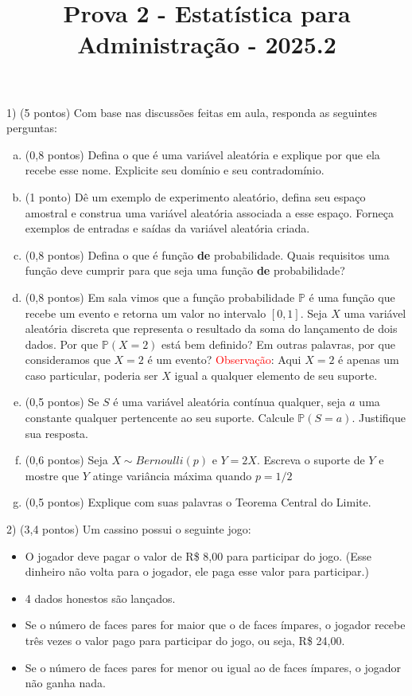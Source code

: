 \documentclass[12pt]{article}
\title{Prova 2 - Estatística para Administração - 2025.2}
\date{}
\makeatletter
\renewcommand{\maketitle}{
  \begin{center}
    {\small\bfseries \@title \par}
  \end{center}
  \vspace{-0.1cm} %
}
\makeatother
\begin{document}
\maketitle

1) (5 pontos) Com base nas discussões feitas em aula, responda as seguintes perguntas:

\begin{enumerate}[a)]
    \item (0,8 pontos) Defina o que é uma variável aleatória e explique por que ela recebe esse nome. Explicite seu domínio e seu contradomínio. 
    \item (1 ponto) Dê um exemplo de experimento aleatório, defina seu espaço amostral e construa uma variável aleatória associada a esse espaço. Forneça 
    exemplos de entradas e saídas da variável aleatória criada. 
    \item (0,8 pontos) Defina o que é função \textbf{de} probabilidade. Quais requisitos uma função deve cumprir para que seja uma função \textbf{de} probabilidade?
    \item (0,8 pontos) Em sala vimos que a função probabilidade $\mathds{P}$ é uma função que recebe um evento e retorna um valor no intervalo $[0,1]$. 
    Seja $X$ uma variável aleatória discreta que representa o resultado da soma do lançamento de dois dados. Por que $\mathds{P}(X=2)$ está bem definido? Em outras palavras, 
    por que consideramos que $X=2$ é um evento? \textcolor{red}{Observação}: Aqui $X=2$ é apenas um caso particular, poderia ser $X$ igual a qualquer elemento de seu suporte. 
    \item (0,5 pontos) Se $S$ é uma variável aleatória contínua qualquer, seja $a$ uma constante qualquer pertencente ao seu suporte. Calcule $\mathds{P}(S=a)$. Justifique sua resposta.
    \item (0,6 pontos) Seja $X \sim Bernoulli(p)$ e $Y=2X$. Escreva o suporte de $Y$ e mostre que $Y$ atinge variância máxima quando $p=1/2$
    \item (0,5 pontos) Explique com suas palavras o Teorema Central do Limite. 
\end{enumerate}

2) (3,4 pontos) Um cassino possui o seguinte jogo:

\begin{itemize}
    \item O jogador deve pagar o valor de R\$ 8,00 para participar do jogo. (Esse dinheiro não volta para o jogador, ele paga esse valor para participar.)
    \item 4 dados honestos são lançados. 
    \item Se o número de faces pares for maior que o de faces ímpares, o jogador recebe três vezes o valor pago para participar do jogo, ou seja, R\$ 24,00. 
    \item Se o número de faces pares for menor ou igual ao de faces ímpares, o jogador não ganha nada.
\end{itemize}
\end{document}
